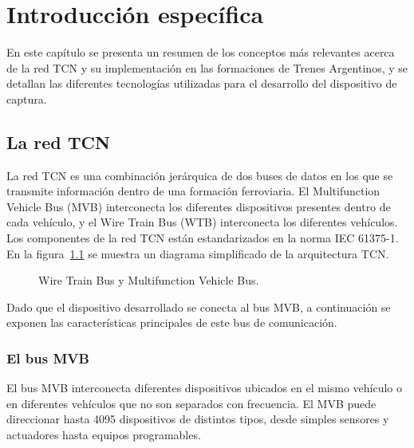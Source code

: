 \chapter{Introducción específica}

En este capítulo se presenta un resumen de los conceptos más relevantes acerca de la red TCN y su implementación en las formaciones de Trenes Argentinos, y se detallan las diferentes tecnologías utilizadas para el desarrollo del dispositivo de captura.

\section{La red TCN}

La red TCN es una combinación jerárquica de dos buses de datos en los que se transmite información dentro de una formación ferroviaria. El Multifunction Vehicle Bus (MVB) interconecta los diferentes dispositivos presentes dentro de cada vehículo, y el Wire Train Bus (WTB) interconecta los diferentes vehículos. Los componentes de la red TCN están estandarizados en la norma IEC 61375-1. En la figura~\ref{fig:tcn-mvb-wtb} se muestra un diagrama simplificado de la arquitectura TCN.

\begin{figure}[htbp]
	\centering
    {
        \fontsize{9pt}{9pt}\selectfont
        
    }
	\caption[Wire Train Bus y Multifunction Vehicle Bus]{Wire Train Bus y Multifunction Vehicle Bus.\footnotemark}
    \label{fig:tcn-mvb-wtb}
\end{figure}

Dado que el dispositivo desarrollado se conecta al bus MVB, a continuación se exponen las características principales de este bus de comunicación.

\subsection{El bus MVB}

El bus MVB interconecta diferentes dispositivos ubicados en el mismo vehículo o en diferentes vehículos que no son separados con frecuencia. El MVB puede direccionar hasta 4095 dispositivos de distintos tipos, desde simples sensores y actuadores hasta equipos programables.

